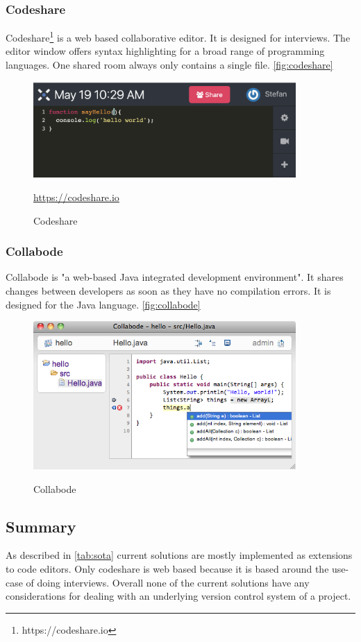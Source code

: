 \subsubsection{Codeshare}
Codeshare\footnote{https://codeshare.io} is a web based collaborative editor. It is designed for interviews. The editor window offers syntax highlighting for a broad range of programming languages. One shared room always only contains a single file. \autoref{fig:codeshare}
\begin{figure}[h]
    \centering
    \includegraphics[width=100mm]{figures/screenshots/codeshare.png}
	\caption{Codeshare}
	\href{https://codeshare.io}{https://codeshare.io}
    \label{fig:codeshare}
\end{figure}
\subsubsection{Collabode}
Collabode\cite{Goldman:2011:RCC:2047196.2047215} is "a web-based Java integrated development environment". It shares changes between developers as soon as they have no compilation errors. It is designed for the Java language. \autoref{fig:collabode}
\begin{figure}[h]
    \centering
    \includegraphics[width=100mm]{figures/screenshots/collabode.jpg}
	\caption{Collabode}
	\cite{Goldman:2011:RCC:2047196.2047215}
    \label{fig:collabode}
\end{figure}
\subsection{Summary}
As described in \autoref{tab:sota} current solutions are mostly implemented as extensions to code editors. Only codeshare is web based because it is based around the use-case of doing interviews. Overall none of the current solutions have any considerations for dealing with an underlying version control system of a project.

